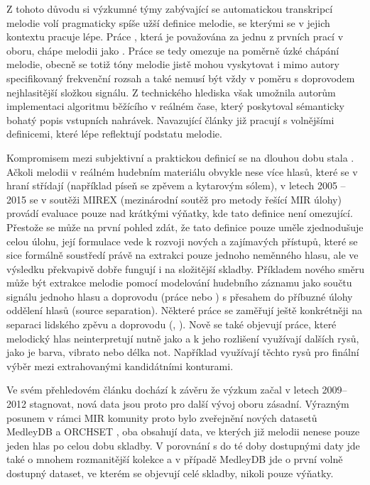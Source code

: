 Z tohoto důvodu si výzkumné týmy zabývající se automatickou transkripcí melodie volí pragmaticky spíše užší definice melodie, se kterými se v jejich kontextu pracuje lépe. Práce \cite{Goto1999}, která je považována za jednu z prvních prací v oboru, chápe melodii jako . Práce se tedy omezuje na poměrně úzké chápání melodie, obecně se totiž tóny melodie jistě mohou vyskytovat i mimo autory specifikovaný frekvenční rozsah a také nemusí být vždy v poměru s doprovodem nejhlasitější složkou signálu. Z technického hlediska však umožnila autorům implementaci algoritmu běžícího v reálném čase, který poskytoval sémanticky bohatý popis vstupních nahrávek. Navazující články již pracují s volnějšími definicemi, které lépe reflektují podstatu melodie. 

Kompromisem mezi subjektivní a praktickou definicí se na dlouhou dobu stala . Ačkoli melodii v reálném hudebním materiálu obvykle nese více hlasů, které se v hraní střídají (například píseň se zpěvem a kytarovým sólem), v letech 2005 -- 2015 se v soutěži MIREX (mezinárodní soutěž pro metody řešící MIR úlohy) provádí evaluace pouze nad krátkými výňatky, kde tato definice není omezující. Přestože se může na první pohled zdát, že tato definice pouze uměle zjednodušuje celou úlohu, její formulace vede k rozvoji nových a zajímavých přístupů, které se sice formálně soustředí právě na extrakci pouze jednoho neměnného hlasu, ale ve výsledku překvapivě dobře fungují i na složitější skladby. Příkladem nového směru může být extrakce melodie pomocí modelování hudebního záznamu jako součtu signálu jednoho hlasu a doprovodu (práce \cite{Durrieu2010} nebo \cite{Bosch2016b}) s přesahem do příbuzné úlohy oddělení hlasů (source separation). Některé práce se zaměřují ještě konkrétněji na separaci lidského zpěvu a doprovodu (\cite{Hsu2010}, \cite{Ikemiya2016}). Nově se také objevují práce, které  melodický hlas neinterpretují nutně jako  a k jeho rozlišení využívají dalších rysů, jako je barva, vibrato nebo délka not. Například \cite{Salamon2012a} využívají těchto rysů pro finální výběr mezi extrahovanými kandidátními konturami.

Ve svém přehledovém článku \cite{Salamon2014} dochází k závěru že výzkum začal v letech 2009--2012 stagnovat, nová data jsou proto pro další vývoj oboru zásadní. Výrazným posunem v rámci MIR komunity proto bylo zveřejnění nových datasetů MedleyDB \citep{Bittner2014} a ORCHSET \citep{Bosch2016}, oba obsahují data, ve kterých již melodii nenese pouze jeden hlas po celou dobu skladby. V porovnání s do té doby dostupnými daty jde také o mnohem rozmanitější kolekce a v případě MedleyDB jde o první volně dostupný dataset, ve kterém se objevují celé skladby, nikoli pouze výňatky.


